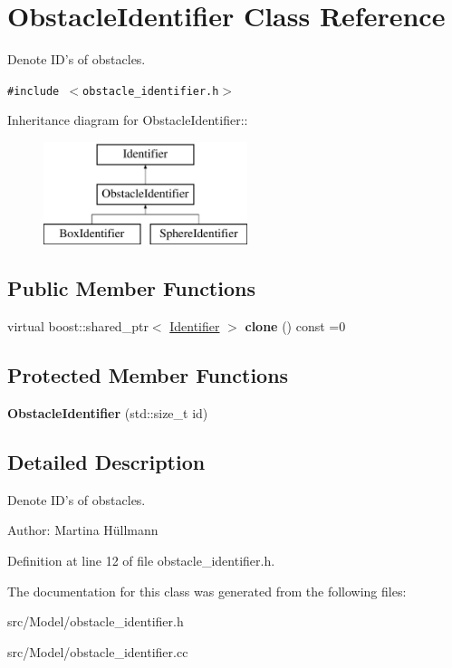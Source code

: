 \hypertarget{class_obstacle_identifier}{
\section{ObstacleIdentifier Class Reference}
\label{class_obstacle_identifier}
}
Denote ID's of obstacles.  


{\tt \#include $<$obstacle\_\-identifier.h$>$}

Inheritance diagram for ObstacleIdentifier::\begin{figure}[H]
\begin{center}
\leavevmode
\includegraphics[height=3cm]{class_obstacle_identifier}
\end{center}
\end{figure}
\subsection*{Public Member Functions}
\begin{CompactItemize}
\item 
\hypertarget{class_obstacle_identifier_a9fb5f13b6cf6bdb188be340935e40a4}{
virtual boost::shared\_\-ptr$<$ \hyperlink{class_identifier}{Identifier} $>$ \textbf{clone} () const =0}
\label{class_obstacle_identifier_a9fb5f13b6cf6bdb188be340935e40a4}

\end{CompactItemize}
\subsection*{Protected Member Functions}
\begin{CompactItemize}
\item 
\hypertarget{class_obstacle_identifier_cba46d07cc834e281e891526f3a0f631}{
\textbf{ObstacleIdentifier} (std::size\_\-t id)}
\label{class_obstacle_identifier_cba46d07cc834e281e891526f3a0f631}

\end{CompactItemize}


\subsection{Detailed Description}
Denote ID's of obstacles. 

\begin{Desc}
\item[Author:]Martina Hüllmann \end{Desc}


Definition at line 12 of file obstacle\_\-identifier.h.

The documentation for this class was generated from the following files:\begin{CompactItemize}
\item 
src/Model/obstacle\_\-identifier.h\item 
src/Model/obstacle\_\-identifier.cc\end{CompactItemize}
